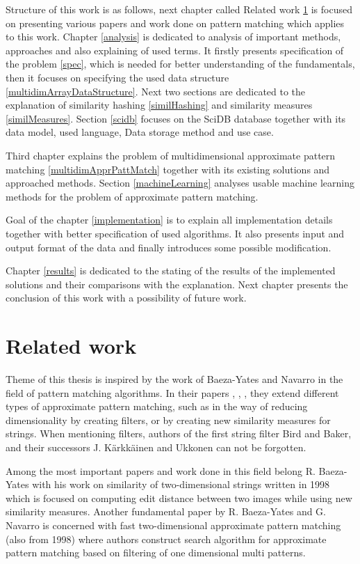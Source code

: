 Structure of this work is as follows, next chapter called Related work \ref{relatedWork} is focused on presenting various papers and work done on pattern matching which applies to this work. Chapter \ref{analysis} is dedicated to analysis of important methods, approaches and also explaining of used terms. It firstly presents specification of the problem \ref{spec}, which is needed for better understanding of the fundamentals, then it focuses on specifying the used data structure \ref{multidimArrayDataStructure}. Next two sections are dedicated to the explanation of similarity hashing \ref{similHashing} and similarity measures \ref{similMeasures}. Section \ref{scidb} focuses on the SciDB database together with its data model, used language, Data storage method and use case. 

Third chapter explains the problem of multidimensional approximate pattern matching 
\ref{multidimApprPattMatch} together with its existing solutions and approached methods. Section \ref{machineLearning} analyses usable machine learning methods for the problem of approximate pattern matching.

Goal of the chapter \ref{implementation} is to explain all implementation details together with better specification of used algorithms. It also presents input and output format of the data and finally introduces some possible modification.

Chapter \ref{results} is dedicated to the stating of the results of the implemented solutions and their comparisons with the explanation. Next chapter presents the conclusion of this work with a possibility of future work. 

\chapter{Related work} \label{relatedWork}
Theme of this thesis is inspired by the work of Baeza-Yates and Navarro in the field of pattern matching algorithms. In their papers \cite{mdApproxPM}, \cite{fast2DapproxPM}, \cite{fastMDApproxPM}, they extend different types of approximate pattern matching, such as in the way of reducing dimensionality by creating filters, or by creating new similarity measures for strings. When mentioning filters, authors of the first string filter Bird and Baker, and their successors J. K{\" a}rkk{\" a}inen and Ukkonen can not be forgotten.

Among the most important papers and work done in this field belong R. Baeza-Yates with his work on similarity of two-dimensional strings written in 1998 \cite{sim2Dstrings} which is focused on computing edit distance between two images while using new similarity measures. Another fundamental paper by R. Baeza-Yates and G. Navarro \cite{fast2DapproxPM} is concerned with fast two-dimensional approximate pattern matching (also from 1998) where authors construct search algorithm for approximate pattern matching based on filtering of one dimensional multi patterns.

